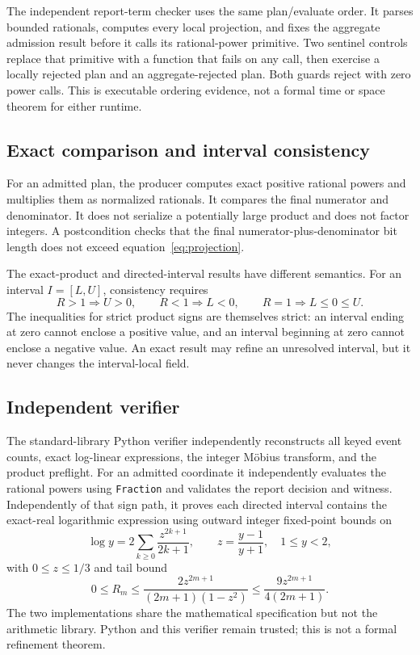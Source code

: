 \documentclass[11pt]{article}
\theoremstyle{definition}
\begin{document}
The independent report-term checker uses the same plan/evaluate order.  It parses bounded
rationals, computes every local projection, and fixes the aggregate admission result before it
calls its rational-power primitive.  Two sentinel controls replace that primitive with a function
that fails on any call, then exercise a locally rejected plan and an aggregate-rejected plan.  Both
guards reject with zero power calls.  This is executable ordering evidence, not a formal time or
space theorem for either runtime.

\subsection{Exact comparison and interval consistency}

For an admitted plan, the producer computes exact positive rational powers and multiplies them as
normalized rationals.  It compares the final numerator and denominator.  It does not serialize a
potentially large product and does not factor integers.  A postcondition checks that the final
numerator-plus-denominator bit length does not exceed equation~\eqref{eq:projection}.

The exact-product and directed-interval results have different semantics.  For an interval
\(I=[L,U]\), consistency requires
\[
R>1\Longrightarrow U>0,\qquad
R<1\Longrightarrow L<0,\qquad
R=1\Longrightarrow L\le 0\le U.
\]
The inequalities for strict product signs are themselves strict: an interval ending at zero
cannot enclose a positive value, and an interval beginning at zero cannot enclose a negative
value.  An exact result may refine an unresolved interval, but it never changes the interval-local
field.

\subsection{Independent verifier}

The standard-library Python verifier independently reconstructs all keyed event counts, exact
log-linear expressions, the integer M\"obius transform, and the product preflight.  For an admitted
coordinate it independently evaluates the rational powers using \texttt{Fraction} and validates
the report decision and witness.  Independently of that sign path, it proves each directed
interval contains the exact-real logarithmic expression using outward integer fixed-point bounds
on
\[
\log y=2\sum_{k\ge0}\frac{z^{2k+1}}{2k+1},
\qquad z=\frac{y-1}{y+1},\quad 1\le y<2,
\]
with \(0\le z\le1/3\) and tail bound
\begin{equation}\label{eq:tail}
0\le R_m\le
\frac{2z^{2m+1}}{(2m+1)(1-z^2)}
\le\frac{9z^{2m+1}}{4(2m+1)}.
\end{equation}
The two implementations share the mathematical specification but not the arithmetic library.
Python and this verifier remain trusted; this is not a formal refinement theorem.
\end{document}
